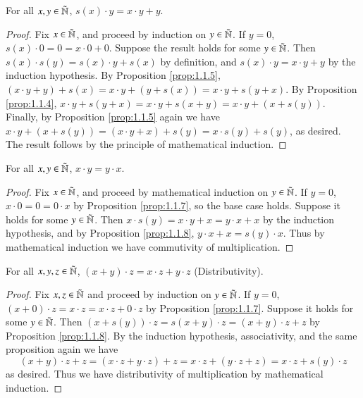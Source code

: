 \begin{proposition}\label{prop:1.1.8}
    For all $x,y \in \tilde{\mathbb N}$, $s(x)\cdot y = x\cdot y + y$.
\end{proposition}
\begin{proof}
    Fix $x \in \tilde{\mathbb N}$, and proceed by induction on $y \in \tilde{\mathbb N}$. If $y = 0$, $s(x)\cdot 0 = 0 = x\cdot 0 + 0$. Suppose the result holds for some $y \in \tilde{\mathbb N}$. Then $s(x)\cdot s(y) = s(x)\cdot y + s(x)$ by definition, and $s(x)\cdot y = x\cdot y + y$ by the induction hypothesis. By Proposition \ref{prop:1.1.5}, $(x\cdot y+y)+s(x) = x\cdot y + (y+s(x)) = x\cdot y + s(y+x)$. By Proposition \ref{prop:1.1.4}, $x\cdot y + s(y+x) = x\cdot y + s(x+y) = x\cdot y + (x+s(y))$. Finally, by Proposition \ref{prop:1.1.5} again we have $x\cdot y + (x+s(y)) = (x\cdot y + x) + s(y) = x\cdot s(y)+s(y)$, as desired. The result follows by the principle of mathematical induction.
\end{proof}

\begin{proposition}\label{prop:1.1.9}
    For all $x,y \in \tilde{\mathbb N}$, $x\cdot y = y\cdot x$.
\end{proposition}
\begin{proof}
    Fix $x \in \tilde{\mathbb N}$, and proceed by mathematical induction on $y \in \tilde{\mathbb N}$. If $y = 0$, $x \cdot 0 = 0 = 0\cdot x$ by Proposition \ref{prop:1.1.7}, so the base case holds. Suppose it holds for some $y \in \tilde{\mathbb N}$. Then $x\cdot s(y) = x\cdot y + x = y\cdot x + x$ by the induction hypothesis, and by Proposition \ref{prop:1.1.8}, $y\cdot x + x = s(y)\cdot x$. Thus by mathematical induction we have commutivity of multiplication.
\end{proof}

\begin{proposition}\label{prop:1.1.10}
    For all $x,y,z \in \tilde{\mathbb N}$, $(x+y)\cdot z = x\cdot z + y \cdot z$ (Distributivity).
\end{proposition}
\begin{proof}
    Fix $x,z \in  \tilde{\mathbb N}$ and proceed by induction on $y \in \tilde{\mathbb N}$. If $y = 0$, $(x+0)\cdot z = x\cdot z = x\cdot z + 0\cdot z$ by Proposition \ref{prop:1.1.7}. Suppose it holds for some $y \in \tilde{\mathbb N}$. Then $(x+s(y))\cdot z = s(x+y)\cdot z = (x+y)\cdot z + z$ by Proposition \ref{prop:1.1.8}. By the induction hypothesis, associativity, and the same proposition again we have $$(x+y)\cdot z + z = (x\cdot z + y \cdot z) + z = x\cdot z + (y\cdot z + z) = x\cdot z + s(y)\cdot z$$
    as desired. Thus we have distributivity of multiplication by mathematical induction.
\end{proof}

